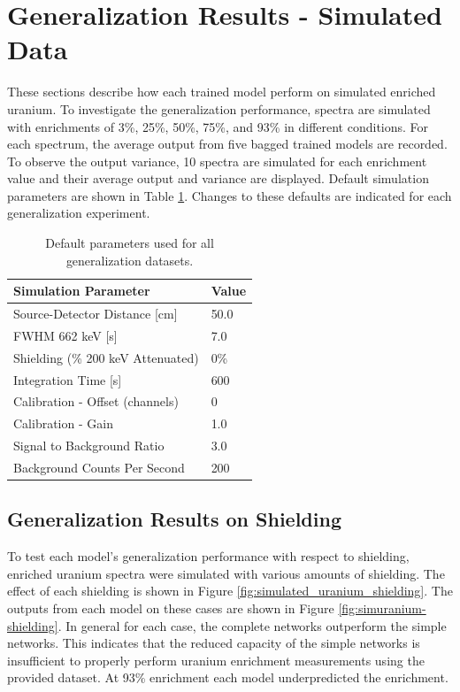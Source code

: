 \section{Generalization Results - Simulated Data}

These sections describe how each trained model perform on simulated enriched uranium. To investigate the generalization performance, spectra are simulated with enrichments of 3\%, 25\%, 50\%, 75\%, and 93\% in different conditions. For each spectrum, the average output from five bagged trained models are recorded. To observe the output variance, 10 spectra are simulated for each enrichment value and their average output and variance are displayed. Default simulation parameters are shown in Table \ref{table:default_sim_params_uranium}. Changes to these defaults are indicated for each generalization experiment.

\begin{table}[H]
\centering
\caption{Default parameters used for all generalization datasets.}
\label{table:default_sim_params_uranium}
\begin{tabular}{ll}
\hline
\textbf{Simulation Parameter} &  \textbf{Value} \\ \hline
Source-Detector Distance [cm] & 50.0\\ 
FWHM 662 keV [s] & 7.0\\
Shielding (\% 200 keV Attenuated) & 0\% \\ 
Integration Time [s] & 600 \\ 
Calibration - Offset (channels) & 0 \\ 
Calibration - Gain & 1.0 \\ 
Signal to Background Ratio & 3.0 \\ 
Background Counts Per Second & 200 \\ \hline
\end{tabular}
\end{table}

\subsection{Generalization Results on Shielding}

To test each model's generalization performance with respect to shielding, enriched uranium spectra were simulated with various amounts of shielding. The effect of each shielding is shown in Figure \ref{fig:simulated_uranium_shielding}. The outputs from each model on these cases are shown in Figure \ref{fig:simuranium-shielding}. In general for each case, the complete networks outperform the simple networks. This indicates that the reduced capacity of the simple networks is insufficient to properly perform uranium enrichment measurements using the provided dataset. At 93\% enrichment each model underpredicted the enrichment.


